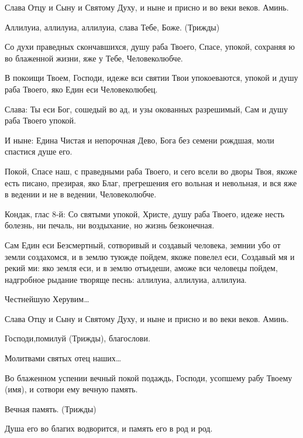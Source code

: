 \begin{mymulticols}
Слава Отцу и Сыну и Святому Духу, и ныне и присно и во веки веков. Аминь. 

Аллилуиа, аллилуиа, аллилуиа, слава Тебе, Боже. (Трижды)




Со духи праведных скончавшихся, душу раба Твоего, Спасе, упокой, сохраняя ю во блаженной жизни, яже у Тебе, Человеколюбче. 

В покоищи Твоем, Господи, идеже вси святии Твои упокоеваются, упокой и душу раба Твоего, яко Един еси Человеколюбец. 

Слава: Ты еси Бог, сошедый во ад, и узы окованных разрешимый, Сам и душу раба Твоего упокой. 

И ныне: Едина Чистая и непорочная Дево, Бога без семени рождшая, моли спастися душе его.




Покой, Спасе наш, с праведными раба Твоего, и сего всели во дворы Твоя, якоже есть писано, презирая, яко Благ, прегрешения его вольная и невольная, и вся яже в ведении и не в ведении, Человеколюбче. 

Кондак, глас 8-й: Со святыми упокой, Христе, душу раба Твоего, идеже несть болезнь, ни печаль, ни воздыхание, но жизнь безконечная.




Сам Един еси Безсмертный, сотворивый и создавый человека, земнии убо от земли создахомся, и в землю туюжде пойдем, якоже повелел еси, Создавый мя и рекий ми: яко земля еси, и в землю отъидеши, аможе вси человецы пойдем, надгробное рыдание творяще песнь: аллилуиа, аллилуиа, аллилуиа. 

Честнейшую Херувим… 

Слава Отцу и Сыну и Святому Духу, и ныне и присно и во веки веков. Аминь. 

Господи,помилуй (Трижды), благослови. 

Молитвами святых отец наших… 

Во блаженном успении вечный покой подаждь, Господи, усопшему рабу Твоему (имя), и сотвори ему вечную память. 

Вечная память. (Трижды) 

Душа его во благих водворится, и память его в род и род. 

\end{mymulticols}

\mychapterending


